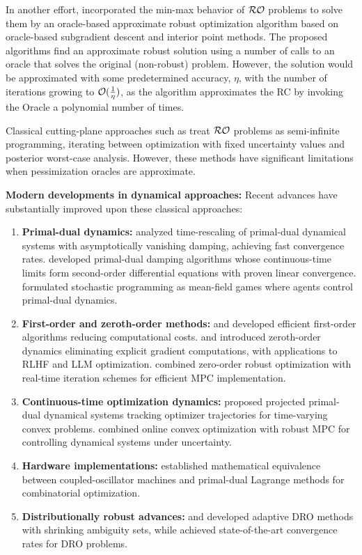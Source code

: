 \documentclass[journal,twoside,web]{ieeecolor}
\begin{document}
In another effort, \cite{bental2015} incorporated the min-max behavior of ${\cal RO}$ problems to solve them by an oracle-based approximate robust optimization algorithm based on oracle-based subgradient descent and interior point methods. The proposed algorithms find an approximate robust solution using a number of calls to an oracle that solves the original (non-robust) problem. However, the solution would be approximated with some predetermined accuracy, $\eta$, with the number of iterations growing to ${\cal O}(\frac{1}{\eta})$, as the algorithm approximates the RC by invoking the Oracle a polynomial number of times.
{\color{blue} Classical cutting-plane approaches such as \cite{mutapcic2009} treat ${\cal RO}$ problems as semi-infinite programming, iterating between optimization with fixed uncertainty values and posterior worst-case analysis. However, these methods have significant limitations when pessimization oracles are approximate.

\textbf{Modern developments in dynamical approaches:} Recent advances have substantially improved upon these classical approaches:
\begin{enumerate}
\item \textbf{Primal-dual dynamics:} \cite{timerescaling2023} analyzed time-rescaling of primal-dual dynamical systems with asymptotically vanishing damping, achieving fast convergence rates. \cite{pddamping2023} developed primal-dual damping algorithms whose continuous-time limits form second-order differential equations with proven linear convergence. \cite{meanfield2023} formulated stochastic programming as mean-field games where agents control primal-dual dynamics.
\item \textbf{First-order and zeroth-order methods:} \cite{nguyen2018} and \cite{he2022} developed efficient first-order algorithms reducing computational costs. \cite{chen2022} and \cite{zoranksg2023} introduced zeroth-order dynamics eliminating explicit gradient computations, with applications to RLHF and LLM optimization. \cite{zoro2023} combined zero-order robust optimization with real-time iteration schemes for efficient MPC implementation.
\item \textbf{Continuous-time optimization dynamics:} \cite{zhang2023dynamics} proposed projected primal-dual dynamical systems tracking optimizer trajectories for time-varying convex problems. \cite{onlineconvex2024} combined online convex optimization with robust MPC for controlling dynamical systems under uncertainty.
\item \textbf{Hardware implementations:} \cite{oscillator2024} established mathematical equivalence between coupled-oscillator machines and primal-dual Lagrange methods for combinatorial optimization.
\item \textbf{Distributionally robust advances:} \cite{aigner2023} and \cite{yang2023} developed adaptive DRO methods with shrinking ambiguity sets, while \cite{drago2024} achieved state-of-the-art convergence rates for DRO problems.
\end{enumerate}

}
\end{document}
